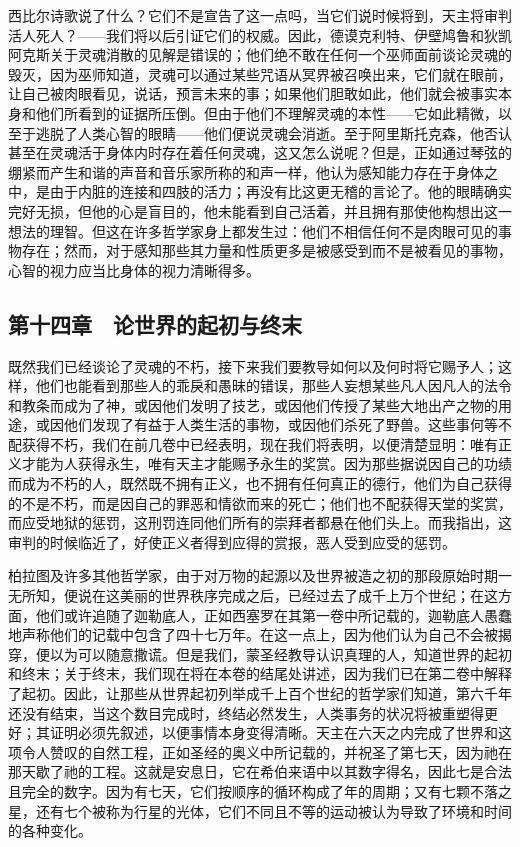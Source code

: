 西比尔诗歌说了什么？它们不是宣告了这一点吗，当它们说时候将到，天主将审判活人死人？——我们将以后引证它们的权威。因此，德谟克利特、伊壁鸠鲁和狄凯阿克斯关于灵魂消散的见解是错误的；他们绝不敢在任何一个巫师面前谈论灵魂的毁灭，因为巫师知道，灵魂可以通过某些咒语从冥界被召唤出来，它们就在眼前，让自己被肉眼看见，说话，预言未来的事；如果他们胆敢如此，他们就会被事实本身和他们所看到的证据所压倒。但由于他们不理解灵魂的本性——它如此精微，以至于逃脱了人类心智的眼睛——他们便说灵魂会消逝。至于阿里斯托克森，他否认甚至在灵魂活于身体内时存在着任何灵魂，这又怎么说呢？但是，正如通过琴弦的绷紧而产生和谐的声音和音乐家所称的和声一样，他认为感知能力存在于身体之中，是由于内脏的连接和四肢的活力；再没有比这更无稽的言论了。他的眼睛确实完好无损，但他的心是盲目的，他未能看到自己活着，并且拥有那使他构想出这一想法的理智。但这在许多哲学家身上都发生过：他们不相信任何不是肉眼可见的事物存在；然而，对于感知那些其力量和性质更多是被感受到而不是被看见的事物，心智的视力应当比身体的视力清晰得多。\par


\subsection{第十四章　论世界的起初与终末}

既然我们已经谈论了灵魂的不朽，接下来我们要教导如何以及何时将它赐予人；这样，他们也能看到那些人的乖戾和愚昧的错误，那些人妄想某些凡人因凡人的法令和教条而成为了神，或因他们发明了技艺，或因他们传授了某些大地出产之物的用途，或因他们发现了有益于人类生活的事物，或因他们杀死了野兽。这些事何等不配获得不朽，我们在前几卷中已经表明，现在我们将表明，以便清楚显明：唯有正义才能为人获得永生，唯有天主才能赐予永生的奖赏。因为那些据说因自己的功绩而成为不朽的人，既然既不拥有正义，也不拥有任何真正的德行，他们为自己获得的不是不朽，而是因自己的罪恶和情欲而来的死亡；他们也不配获得天堂的奖赏，而应受地狱的惩罚，这刑罚连同他们所有的崇拜者都悬在他们头上。而我指出，这审判的时候临近了，好使正义者得到应得的赏报，恶人受到应受的惩罚。\par

柏拉图及许多其他哲学家，由于对万物的起源以及世界被造之初的那段原始时期一无所知，便说在这美丽的世界秩序完成之后，已经过去了成千上万个世纪；在这方面，他们或许追随了迦勒底人，正如西塞罗在其第一卷中所记载的，迦勒底人愚蠢地声称他们的记载中包含了四十七万年。在这一点上，因为他们认为自己不会被揭穿，便以为可以随意撒谎。但是我们，蒙圣经教导认识真理的人，知道世界的起初和终末；关于终末，我们现在将在本卷的结尾处讲述，因为我们已在第二卷中解释了起初。因此，让那些从世界起初列举成千上百个世纪的哲学家们知道，第六千年还没有结束，当这个数目完成时，终结必然发生，人类事务的状况将被重塑得更好；其证明必须先叙述，以便事情本身变得清晰。天主在六天之内完成了世界和这项令人赞叹的自然工程，正如圣经的奥义中所记载的，并祝圣了第七天，因为祂在那天歇了祂的工程。这就是安息日，它在希伯来语中以其数字得名，因此七是合法且完全的数字。因为有七天，它们按顺序的循环构成了年的周期；又有七颗不落之星，还有七个被称为行星的光体，它们不同且不等的运动被认为导致了环境和时间的各种变化。\par


